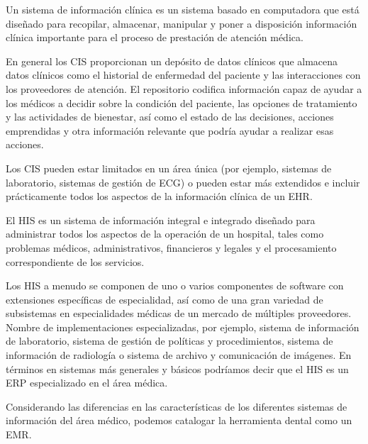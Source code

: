 \vspace{1em}

Un sistema de información clínica es un sistema basado en computadora que está diseñado para recopilar, almacenar, manipular y poner a disposición información clínica importante para el proceso de prestación de atención médica.

\vspace{1em}

En general los CIS proporcionan un depósito de datos clínicos que almacena datos clínicos como el historial de enfermedad del paciente y las interacciones con los proveedores de atención. El repositorio codifica información capaz de ayudar a los médicos a decidir sobre la condición del paciente, las opciones de tratamiento y las actividades de bienestar, así como el estado de las decisiones, acciones emprendidas y otra información relevante que podría ayudar a realizar esas acciones.

\vspace{1em}

Los CIS pueden estar limitados en un área única (por ejemplo, sistemas de laboratorio, sistemas de gestión de ECG) o pueden estar más extendidos e incluir prácticamente todos los aspectos de la información clínica de un EHR.

\vspace{1em}

El HIS es un sistema de información integral e integrado diseñado para administrar todos los aspectos de la operación de un hospital, tales como problemas médicos, administrativos, financieros y legales y el procesamiento correspondiente de los servicios. 

\vspace{1em}

Los HIS a menudo se componen de uno o varios componentes de software con extensiones específicas de especialidad, así como de una gran variedad de subsistemas en especialidades médicas de un mercado de múltiples proveedores. Nombre de implementaciones especializadas, por ejemplo, sistema de información de laboratorio, sistema de gestión de políticas y procedimientos, sistema de información de radiología o sistema de archivo y comunicación de imágenes. En términos en sistemas más generales y básicos podríamos decir que el HIS es un ERP especializado en el área médica.

\vspace{1em}

Considerando las diferencias en las características de los diferentes sistemas de información del área médico, podemos catalogar la herramienta dental como un EMR.

